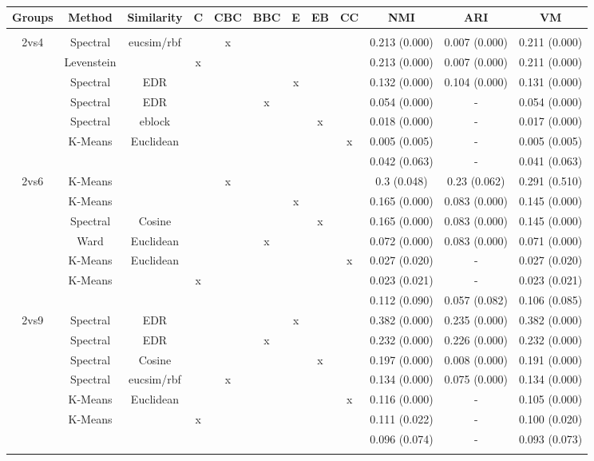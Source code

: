 \documentclass[12pt,a4paper,bibliography=totocnumbered,listof=totocnumbered]{scrartcl}
\begin{document}
{\begin{appendix}
\begin{table}[!htbp] \centering 
	\caption{} 
	\label{} 
	\scriptsize 
	\begin{tabular}{@{\extracolsep{0pt}} cccccccccccc} 
		\toprule
		Groups & Method & Similarity & C & CBC & BBC & E & EB & CC & NMI & ARI & VM \\ 
		\hline \\[-1.8ex] 
		2vs4 & Spectral & eucsim/rbf &  & x &  &  &  &  & 0.213 (0.000) & 0.007 (0.000) & 0.211 (0.000) \\ 
		& Levenstein &  & x &  &  &  &  &  & 0.213 (0.000) & 0.007 (0.000) & 0.211 (0.000) \\ 
		& Spectral & EDR &  &  &  & x &  &  & 0.132 (0.000) & 0.104 (0.000) & 0.131 (0.000) \\ 
		& Spectral & EDR &  &  & x &  &  &  & 0.054 (0.000) & - & 0.054 (0.000) \\ 
		& Spectral & eblock &  &  &  &  & x &  & 0.018 (0.000) & - & 0.017 (0.000) \\ 
		& K-Means & Euclidean &  &  &  &  &  & x & 0.005 (0.005) & - & 0.005 (0.005) \\ 
		&  &  &  &  &  &  &  &  & 0.042 (0.063) & - & 0.041 (0.063) \\ 
		2vs6 & K-Means &  &  & x &  &  &  &  & 0.3 (0.048) & 0.23 (0.062) & 0.291 (0.510) \\ 
		& K-Means &  &  &  &  & x &  &  & 0.165 (0.000) & 0.083 (0.000) & 0.145 (0.000) \\ 
		& Spectral & Cosine &  &  &  &  & x &  & 0.165 (0.000) & 0.083 (0.000) & 0.145 (0.000) \\ 
		& Ward & Euclidean &  &  & x &  &  &  & 0.072 (0.000) & 0.083 (0.000) & 0.071 (0.000) \\ 
		& K-Means & Euclidean &  &  &  &  &  & x & 0.027 (0.020) & - & 0.027 (0.020) \\ 
		& K-Means &  & x &  &  &  &  &  & 0.023 (0.021) & - & 0.023 (0.021) \\ 
		&  &  &  &  &  &  &  &  & 0.112 (0.090) & 0.057 (0.082) & 0.106 (0.085) \\ 
		2vs9 & Spectral & EDR &  &  &  & x &  &  & 0.382 (0.000) & 0.235 (0.000) & 0.382 (0.000) \\ 
		& Spectral & EDR &  &  & x &  &  &  & 0.232 (0.000) & 0.226 (0.000) & 0.232 (0.000) \\ 
		& Spectral & Cosine &  &  &  &  & x &  & 0.197 (0.000) & 0.008 (0.000) & 0.191 (0.000) \\ 
		& Spectral & eucsim/rbf &  & x &  &  &  &  & 0.134 (0.000) & 0.075 (0.000) & 0.134 (0.000) \\ 
		& K-Means & Euclidean &  &  &  &  &  & x & 0.116 (0.000) & - & 0.105 (0.000) \\ 
		& K-Means &  & x &  &  &  &  &  & 0.111 (0.022) & - & 0.100 (0.020) \\ 
		&  &  &  &  &  &  &  &  & 0.096 (0.074) & - & 0.093 (0.073) \\ 
		\hline \\[-1.8ex] 
	\end{tabular} 
	\label{tab:prison2}
\end{table} 






\end{appendix}}
\end{document}
